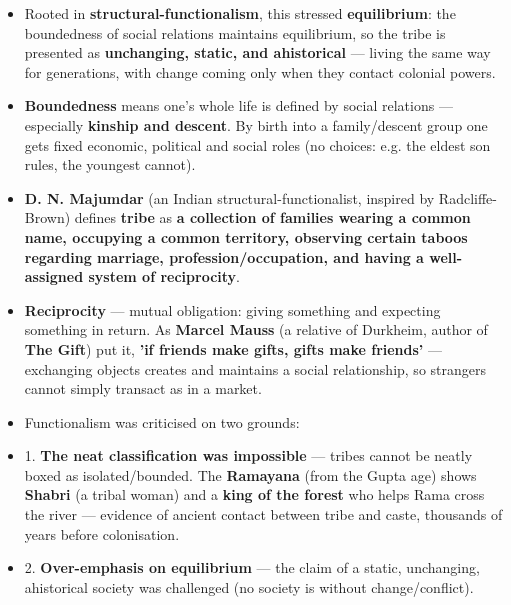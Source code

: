 \begin{itemize}
\item Rooted in \textbf{structural-functionalism}, this stressed \textbf{equilibrium}: the boundedness of social relations maintains equilibrium, so the tribe is presented as \textbf{unchanging, static, and ahistorical} --- living the same way for generations, with change coming only when they contact colonial powers.
\item \textbf{Boundedness} means one's whole life is defined by social relations --- especially \textbf{kinship and descent}. By birth into a family/descent group one gets fixed economic, political and social roles (no choices: e.g. the eldest son rules, the youngest cannot).
\end{itemize}

\begin{KeyConcept}
\begin{itemize}
\item \textbf{D. N. Majumdar} (an Indian structural-functionalist, inspired by Radcliffe-Brown) defines \textbf{tribe} as \textbf{a collection of families wearing a common name, occupying a common territory, observing certain taboos regarding marriage, profession/occupation, and having a well-assigned system of reciprocity}.
\item \textbf{Reciprocity} --- mutual obligation: giving something and expecting something in return. As \textbf{Marcel Mauss} (a relative of Durkheim, author of \textbf{The Gift}) put it, \textbf{'if friends make gifts, gifts make friends'} --- exchanging objects creates and maintains a social relationship, so strangers cannot simply transact as in a market.
\end{itemize}
\end{KeyConcept}

\begin{CriticalPoint}
\begin{itemize}
\item Functionalism was criticised on two grounds:
\item 1. \textbf{The neat classification was impossible} --- tribes cannot be neatly boxed as isolated/bounded. The \textbf{Ramayana} (from the Gupta age) shows \textbf{Shabri} (a tribal woman) and a \textbf{king of the forest} who helps Rama cross the river --- evidence of ancient contact between tribe and caste, thousands of years before colonisation.
\item 2. \textbf{Over-emphasis on equilibrium} --- the claim of a static, unchanging, ahistorical society was challenged (no society is without change/conflict).
\end{itemize}
\end{CriticalPoint}

